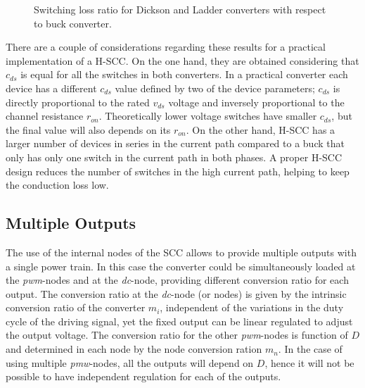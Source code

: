 \begin{SCfigure}
\centering
{}
\caption{Switching loss ratio for Dickson and Ladder converters with respect to buck converter.}
\label{fig:psw_ratio}
\end{SCfigure}

There are a couple of considerations regarding these results for a practical implementation of a H-SCC. On the one hand, they are obtained considering that $c_{ds}$ is equal for all the switches in both converters. In a practical converter each device has a different $c_{ds}$ value defined by two of the device parameters; $c_{ds}$ is directly proportional to the rated $v_{ds}$  voltage and inversely proportional to the channel resistance $r_{on}$. Theoretically lower voltage switches have smaller $c_{ds}$, but the final value will also depends on its $r_{on}$. On the other hand, H-SCC has a larger number of devices in series in the current path compared to a buck that only has only one switch in the current path in both phases. A proper H-SCC design reduces the number of switches in the high current path, helping to keep the conduction loss low. %



\subsection{Multiple Outputs}

The use of the internal nodes of the SCC allows to provide multiple outputs with a single power train. In this case the converter could be simultaneously loaded at the \emph{pwm}-nodes and at the \emph{dc}-node, providing different conversion ratio for each output. The conversion ratio at the \emph{dc}-node (or nodes)  is given by the intrinsic conversion ratio of the converter $m_i$, independent of the variations in the duty cycle of the driving signal, yet the fixed output can be linear regulated to adjust the output voltage.  The conversion ratio for the other \emph{pwm}-nodes is function of $D$ and determined in each node by the node conversion ration $m_n$. In the case of using multiple \emph{pmw}-nodes, all the outputs will depend on $D$, hence it will not be possible to have independent regulation for each of the outputs.

